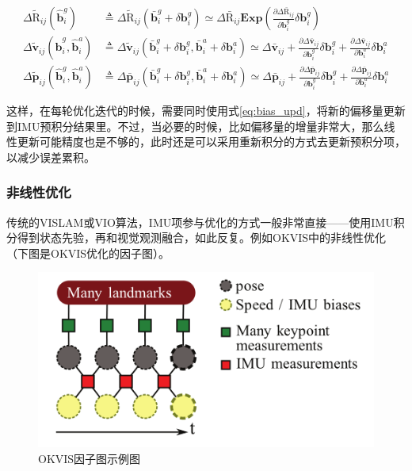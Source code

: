 \begin{equation}
\begin{aligned}
    \Delta\tilde{\mathrm R}_{ij}(\hat{\mathbf b}_i^g)
  &\triangleq \Delta\tilde{\mathrm R}_{ij}(\bar{\mathbf b}^g_i + \delta\mathbf{b}^g_i)
  \simeq \Delta\bar{\mathrm R}_{ij}
  \bm{Exp}\left(
      \tfrac{\partial\Delta\bar{\mathrm R}_{ij}}{\partial\mathbf{b}^g_i}
      \delta\mathbf{b}^g_i
  \right) \\
  \Delta\tilde{\mathbf v}_{ij}(\hat{\mathbf b}^g_i,\hat{\mathbf b}^a_i)
  &\triangleq \Delta\tilde{\mathbf v}_{ij}(
  \bar{\mathbf b}^g_i + \delta\mathbf{b}^g_i,
  \bar{\mathbf b}^a_i + \delta\mathbf{b}^a_i)
  \simeq \Delta\bar{\mathbf v}_{ij} +
  \tfrac{\partial\Delta\bar{\mathbf v}_{ij}}{\partial\mathbf{b}^g_i}
  \delta\mathbf{b}^g_i +
  \tfrac{\partial\Delta\bar{\mathbf v}_{ij}}{\partial\mathbf{b}^a_i}
  \delta\mathbf{b}^a_i \\
  \Delta\tilde{\mathbf p}_{ij}(\hat{\mathbf b}^g_i,\hat{\mathbf b}^a_i)
  &\triangleq \Delta\bar{\mathbf p}_{ij}(
  \bar{\mathbf b}^g_i + \delta\mathbf{b}^g_i,
  \bar{\mathbf b}^a_i + \delta\mathbf{b}^a_i)
  \simeq \Delta\bar{\mathbf p}_{ij} +
  \tfrac{\partial\Delta\bar{\mathbf p}_{ij}}{\partial\mathbf{b}^g_i}
  \delta\mathbf{b}^g_i +
  \tfrac{\partial\Delta\bar{\mathbf p}_{ij}}{\partial\mathbf{b}^a_i}
  \delta\mathbf{b}^a_i
\end{aligned}\label{eq:bias_upd}
\end{equation}

这样，在每轮优化迭代的时候，需要同时使用式\eqref{eq:bias_upd}，将新的偏移量更新到IMU预积分结果里。不过，当必要的时候，比如偏移量的增量非常大，那么线性更新可能精度也是不够的，此时还是可以采用重新积分的方式去更新预积分项，以减少误差累积。

\subsubsection*{非线性优化}

传统的VISLAM或VIO算法，IMU项参与优化的方式一般非常直接——使用IMU积分得到状态先验，再和视觉观测融合，如此反复。例如OKVIS中的非线性优化（下图是OKVIS优化的因子图）。

\begin{figure}[htb!]
    \centering
    \includegraphics[width=.5\textwidth]{./figs/okvis.png}
    \caption{OKVIS因子图示例图\citep{leutenegger2015keyframe}}
    \label{fig:okvis}
\end{figure}

